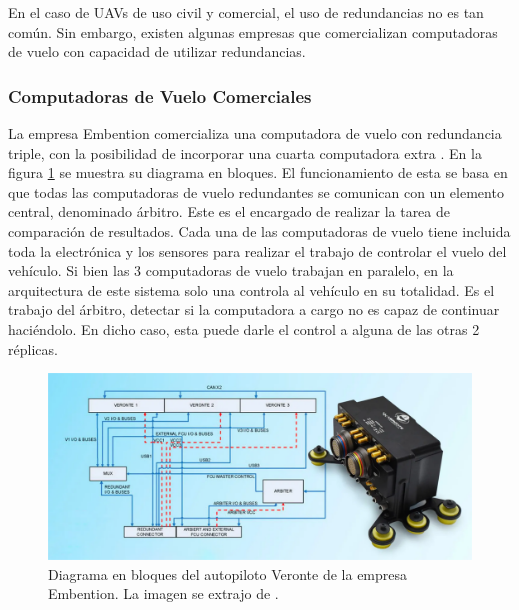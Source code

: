 En el caso de UAVs de uso civil y comercial, el uso de redundancias no es tan común. Sin embargo, existen algunas empresas que comercializan computadoras de vuelo con capacidad de utilizar redundancias. %

\subsubsection{Computadoras de Vuelo Comerciales}

La empresa Embention comercializa una computadora de vuelo con redundancia triple, con la posibilidad de incorporar una cuarta computadora extra \cite{embention-2023}. En la figura \ref{fig:Veronte_Embention} se muestra su diagrama en bloques. El funcionamiento de esta se basa en que todas las computadoras de vuelo redundantes se comunican con un elemento central, denominado árbitro. Este es el encargado de realizar la tarea de comparación de resultados. Cada una de las computadoras de vuelo tiene incluida toda la electrónica y los sensores para realizar el trabajo de controlar el vuelo del vehículo. Si bien las 3 computadoras de vuelo trabajan en paralelo, en la arquitectura de este sistema solo una controla al vehículo en su totalidad. Es el trabajo del árbitro, detectar si la computadora a cargo no es capaz de continuar haciéndolo. En dicho caso, esta puede darle el control a alguna de las otras 2 réplicas.

\begin{figure}[H]
    \centering
    \includegraphics[width=\textwidth]{img/Veronte_Embention.png}
    \caption{Diagrama en bloques del autopiloto Veronte de la empresa Embention. La imagen se extrajo de \cite{embention-2023}.}
    \label{fig:Veronte_Embention}    
\end{figure}



